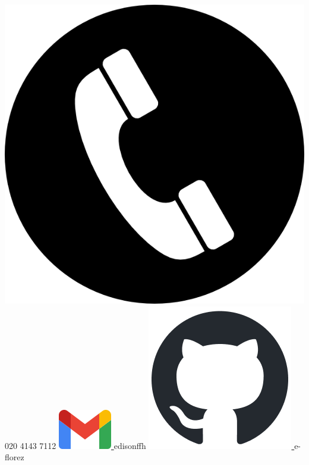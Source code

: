\begin{center}
    \includegraphics[scale=0.3]{figs/phone.png}
    020 4143 7112
    \hspace*{5mm}
    \href{mailto:edisonffh@gmail.com}{
        \includegraphics[scale=0.25]{figs/gmail_icon.png}
    } edisonffh
    \hspace*{5mm}
    \href{https://github.com/e-florez}{
        \includegraphics[scale=0.3]{figs/github-mark.png}
    } e-florez

\end{center}
